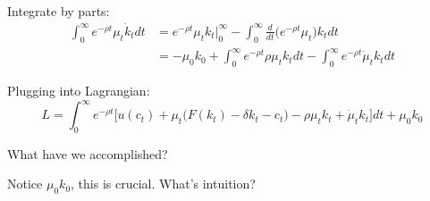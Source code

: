 \documentclass[11pt, aspectratio=169]{beamer}
\newenvironment{witemize}{\itemize\addtolength{\itemsep}{10pt}}{\enditemize}
\begin{document}
\begin{frame}{}
\begin{witemize}		
\item Integrate by parts:
\begin{align*}
	\int_0^\infty e^{-\rho t} \mu_t \dot k_t dt &= e^{-\rho t} \mu_t k_t \Big|_0^\infty - \int_0^\infty \frac{d}{dt} \bigg( e^{-\rho t} \mu_t \bigg) k_t dt \\
	&= - \mu_0 k_0 + \int_0^\infty e^{-\rho t} \rho \mu_t k_t dt - \int_0^\infty e^{-\rho t} \dot \mu_t k_t dt
\end{align*}

\item Plugging into Lagrangian: 
\begin{equation*}
	L = \int_0^\infty e^{-\rho t} \bigg[ u(c_t) + \mu_t \bigg( F(k_t) - \delta k_t - c_t \bigg) - \rho \mu_t k_t + \dot \mu_t k_t \bigg] dt + \mu_0 k_0
\end{equation*}

\item What have we accomplished? 

\item Notice $\mu_0 k_0$, this is crucial. What's intuition? 

\end{witemize}
\end{frame}
\end{document}
